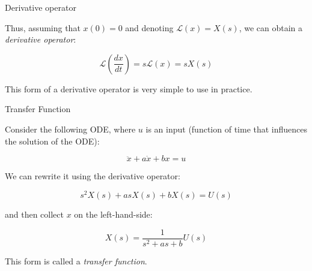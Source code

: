 \documentclass{beamer}
\begin{document}
\begin{frame}{Derivative operator}
\begin{flushleft}

Thus, assuming that $x(0) = 0$ and denoting $\mathcal{L}\left( x \right) = X(s)$, we can obtain a \emph{derivative operator}:

\begin{equation}
\label{eq:NoIC_laplace}
\mathcal{L}\left(\frac{dx}{dt}\right) = s \mathcal{L}\left(x\right) = s X(s)
\end{equation}

\bigskip

This form of a derivative operator is very simple to use in practice.

\end{flushleft}
\end{frame}



\begin{frame}{Transfer Function}
\begin{flushleft}

Consider the following ODE, where $u$ is an input (function of time that influences the solution of the ODE):

\begin{equation}
\ddot x + a \dot x + b x = u
\end{equation}

We can rewrite it using the derivative operator:

\begin{equation}
s^2 X(s) + a s X(s) + b X(s) = U(s)
\end{equation}

and then collect $x$ on the left-hand-side:

\begin{equation}
X(s) = \frac{1}{s^2 + a s + b} U(s)
\end{equation}

This form is called a \emph{transfer function}.

\end{flushleft}
\end{frame}
\end{document}
